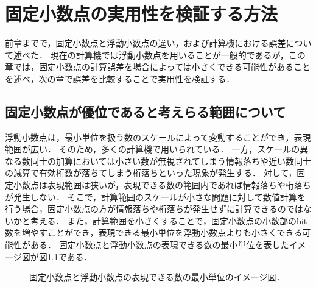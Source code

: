 
\chapter {固定小数点の実用性を検証する方法}
\label{chap:提案手法}
前章までで，固定小数点と浮動小数点の違い，および計算機における誤差について述べた．
現在の計算機では浮動小数点を用いることが一般的であるが，この章では，固定小数点の計算誤差を場合によっては小さくできる可能性があることを述べ，次の章で誤差を比較することで実用性を検証する．

\section{固定小数点が優位であると考えらる範囲について}
浮動小数点は，最小単位を扱う数のスケールによって変動することができ，表現範囲が広い．
そのため，多くの計算機で用いられている．
一方，スケールの異なる数同士の加算においては小さい数が無視されてしまう情報落ちや近い数同士の減算で有効桁数が落ちてしまう桁落ちといった現象が発生する．
対して，固定小数点は表現範囲は狭いが，表現できる数の範囲内であれば情報落ちや桁落ちが発生しない．
そこで，計算範囲のスケールが小さな問題に対して数値計算を行う場合，固定小数点の方が情報落ちや桁落ちが発生せずに計算できるのではないかと考える．
また，計算範囲を小さくすることで，固定小数点の小数部のbit数を増やすことができ，表現できる最小単位を浮動小数点よりも小さくできる可能性がある．
固定小数点と浮動小数点の表現できる数の最小単位を表したイメージ図が図\ref{fig:fixed_float_image}である．

\begin{figure}[H]
    \centering
    \caption{固定小数点と浮動小数点の表現できる数の最小単位のイメージ図．}
    \label{fig:fixed_float_image}
\end{figure}

